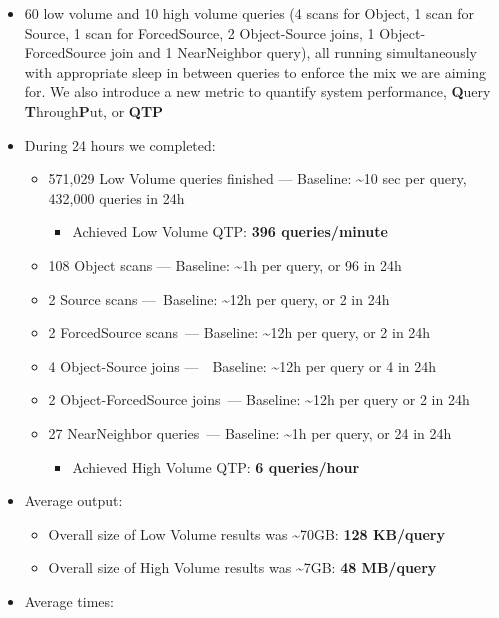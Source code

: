 \documentclass[DM,toc]{lsstdoc}
\begin{document}
\begin{itemize}
\item
  60 low volume and 10 high volume queries (4 scans for Object, 1 scan
  for Source, 1 scan for ForcedSource, 2 Object-Source joins, 1
  Object-ForcedSource join and 1 NearNeighbor query), all running
  simultaneously with appropriate sleep in between queries to enforce
  the mix we are aiming for. We also introduce a new metric to quantify
  system performance, \textbf{Q}uery \textbf{T}hrough\textbf{P}ut, or
  \textbf{QTP}
\item
  During 24 hours we completed:

  \begin{itemize}
  \item
    571,029 Low Volume queries finished --- Baseline:
    \textasciitilde{}10 sec per query, 432,000 queries in 24h

    \begin{itemize}
    \item
      Achieved Low Volume QTP: \textbf{396 queries/minute}
    \end{itemize}
  \item
    108 Object scans --- Baseline: \textasciitilde{}1h per query, or 96
    in 24h
  \item
    2 Source scans ---~Baseline: \textasciitilde{}12h per query, or 2 in
    24h
  \item
    2 ForcedSource scans~--- Baseline: \textasciitilde{}12h per query,
    or 2 in 24h
  \item
    4 Object-Source joins ---~~Baseline: \textasciitilde{}12h per query
    or 4 in 24h
  \item
    2 Object-ForcedSource joins~--- Baseline: \textasciitilde{}12h per
    query or 2 in 24h
  \item
    27 NearNeighbor queries~--- Baseline: \textasciitilde{}1h per query,
    or 24 in 24h

    \begin{itemize}
    \item
      Achieved High Volume QTP: \textbf{6 queries/hour}
    \end{itemize}
  \end{itemize}
\item
  Average output:

  \begin{itemize}
  \item
    Overall size of Low Volume results was \textasciitilde{}70GB:
    \textbf{128 KB/query}
  \item
    Overall size of High Volume results was \textasciitilde{}7GB:
    \textbf{48 MB/query}
  \end{itemize}
\item
  Average times:


\end{itemize}
\end{document}

